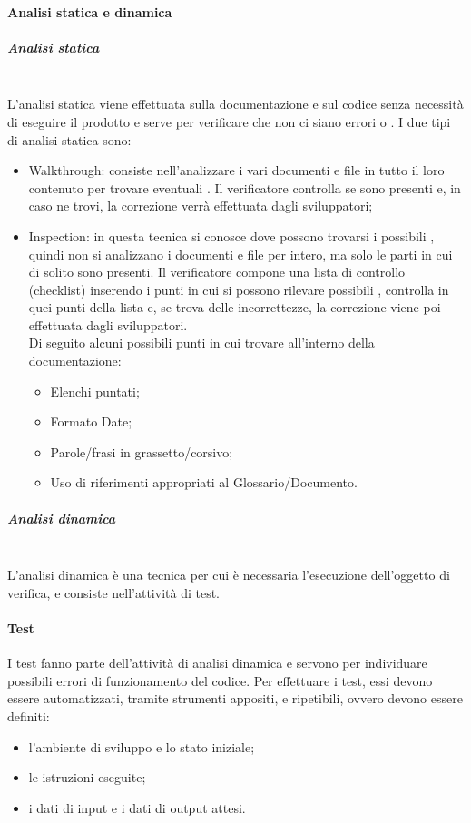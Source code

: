         \paragraph{Analisi statica e dinamica}
            \subparagraph{Analisi statica}\mbox{}\\
                L'analisi statica viene effettuata sulla documentazione e sul codice senza necessità di eseguire il prodotto e serve per verificare che non ci siano errori o . I due tipi di analisi statica sono:
                \begin{itemize}
                    \item Walkthrough: consiste nell'analizzare i vari documenti e file in tutto il loro contenuto per trovare eventuali . Il verificatore controlla se sono presenti  e, in caso ne trovi, la correzione verrà effettuata dagli sviluppatori; 
                    \item Inspection: in questa tecnica si conosce dove possono trovarsi i possibili , quindi non si analizzano i documenti e file per intero, ma solo le parti in cui di solito sono presenti. Il verificatore compone una lista di controllo (checklist) inserendo i punti in cui si possono rilevare possibili , controlla in quei punti della lista e, se trova delle incorrettezze, la correzione viene poi effettuata dagli sviluppatori. \\
			Di seguito alcuni possibili punti in cui trovare  all'interno della documentazione:
			\begin{itemize}
				\item Elenchi puntati;
				\item Formato Date;
				\item Parole/frasi in grassetto/corsivo;
				\item Uso di riferimenti appropriati al Glossario/Documento.
			\end{itemize}
                \end{itemize}
            \subparagraph{Analisi dinamica}\mbox{}\\
                L'analisi dinamica è una tecnica per cui è necessaria l'esecuzione dell'oggetto di verifica, e consiste nell'attività di test.

            \paragraph{Test}
    			I test fanno parte dell'attività di analisi dinamica e servono per individuare possibili errori di funzionamento del codice. Per effettuare i test, essi devono essere automatizzati, tramite strumenti appositi, e ripetibili, ovvero devono essere definiti:
    			\begin{itemize}
    				\item l'ambiente di sviluppo e lo stato iniziale;
    				\item le istruzioni eseguite;
    				\item i dati di input e i dati di output attesi.
    			\end{itemize}

